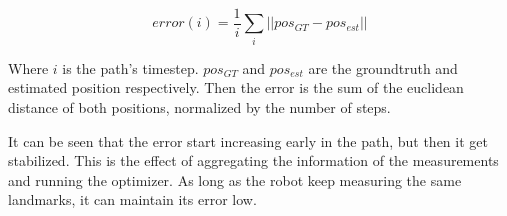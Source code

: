 \begin{equation}
error (i) = \frac{1}{i} \sum_{i} ||pos_{GT}-pos_{est}||
\end{equation} 

Where $i$ is the path's timestep. $pos_{GT}$ and $pos_{est}$ are the groundtruth and estimated position respectively. Then the error is the sum of the euclidean distance of both positions, normalized by the number of steps. 

It can be seen that the error start increasing early in the path, but then it get stabilized. This is the effect of aggregating the information of the measurements and running the optimizer. As long as the robot keep measuring the same landmarks, it can maintain its error low. 


